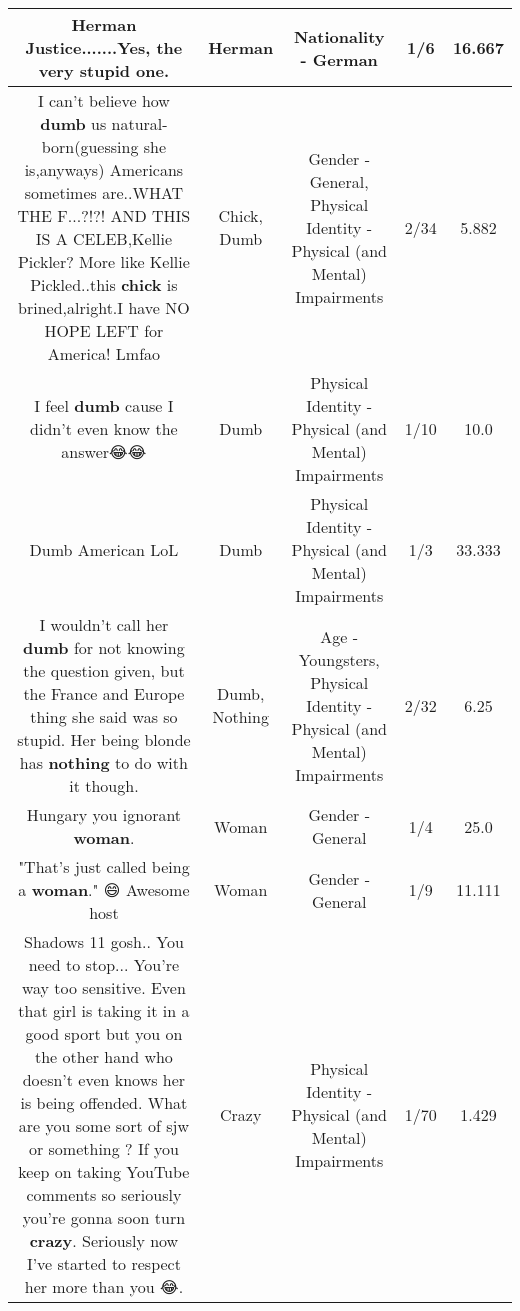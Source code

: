\documentclass[11pt]{article}
\newlength\mylength
\begin{document}
\begin{center}
\begin{longtable}{|C{.65\mylength}|C{.30\mylength}|C{.12\mylength}|C{.12\mylength}|C{.12\mylength}|}
  \small Herman Justice.......Yes, the very stupid one.\normalsize   & Herman & Nationality - German & 1/6 & 16.667 \\  \hline
  \small I can't believe how \textbf{dumb} us natural-born(guessing she is,anyways) Americans sometimes are..WHAT THE F...?!?! AND THIS IS A CELEB,Kellie Pickler? More like Kellie Pickled..this \textbf{chick} is brined,alright.I have NO HOPE LEFT for America! Lmfao\normalsize   & Chick, Dumb & Gender - General, Physical Identity - Physical (and Mental) Impairments & 2/34 & 5.882 \\  \hline
  \small I feel \textbf{dumb} cause I didn't even know the answer😂😂\normalsize   & Dumb & Physical Identity - Physical (and Mental) Impairments & 1/10 & 10.0 \\  \hline
  \small Dumb American LoL\normalsize   & Dumb & Physical Identity - Physical (and Mental) Impairments & 1/3 & 33.333 \\  \hline
  \small I wouldn't call her \textbf{dumb} for not knowing the question given, but the France and Europe thing she said was so stupid. Her being blonde has \textbf{nothing} to do with it though.\normalsize   & Dumb, Nothing & Age - Youngsters, Physical Identity - Physical (and Mental) Impairments & 2/32 & 6.25 \\  \hline
  \small Hungary you ignorant \textbf{woman}.\normalsize   & Woman & Gender - General & 1/4 & 25.0 \\  \hline
  \small "That's just called being a \textbf{woman}." 😄 Awesome host\normalsize   & Woman & Gender - General & 1/9 & 11.111 \\  \hline
  \small Shadows 11 gosh.. You need to stop... You're way too sensitive. Even that girl is taking it in a good sport but you on the other hand who doesn't even knows her is being offended. What are you some sort of sjw or something ? If you keep on taking YouTube comments so  seriously you're gonna soon turn \textbf{crazy}. Seriously now I've started to respect her more than you 😂.\normalsize   & Crazy & Physical Identity - Physical (and Mental) Impairments & 1/70 & 1.429 \\  \hline

\end{longtable}
\end{center}
\end{document}

